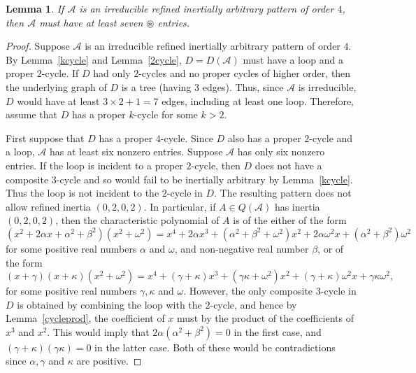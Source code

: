 \documentclass[10pt]{amsart}
\newtheorem{lemma}[proposition]{Lemma}
\begin{document}
\begin{lemma}\label{not6}
If ${\mathcal{A}}$ is an irreducible refined inertially arbitrary 
pattern of order $4$, then ${\mathcal{A}}$ must have at least seven ${\circledast}$ entries.
\end{lemma}

\begin{proof}
Suppose ${\mathcal{A}}$ is an irreducible refined inertially arbitrary pattern of order $4$. 
By Lemma~\ref{kcycle} and Lemma~\ref{2cycle}, $D=D({\mathcal{A}})$ must have a 
loop and a proper $2$-cycle. If $D$ had only $2$-cycles and no
proper cycles of higher order, then the underlying graph of $D$ is a tree (having $3$ edges). Thus, since ${\mathcal{A}}$ is irreducible, 
 $D$ would have at least $3\times 2 +1=7$ edges, including at least one loop. Therefore, assume that $D$ has a proper $k$-cycle for some $k >2$. 

First suppose that $D$ has a proper $4$-cycle. Since $D$ also has a proper $2$-cycle and a loop, 
${\mathcal{A}}$ has at least six nonzero entries. Suppose ${\mathcal{A}}$ has only six nonzero entries. 
If the loop is incident to a proper $2$-cycle, then $D$ does not have a composite $3$-cycle
and so would fail to be inertially arbitrary by Lemma~\ref{kcycle}. Thus the loop is not
incident to the $2$-cycle in $D$. The resulting pattern does not allow refined
inertia $(0,2,0,2)$. In particular, if $A\in Q({\mathcal{A}})$ has inertia $(0,2,0,2)$, then
the characteristic polynomial of $A$ is of the either of the form 
$$(x^2+2\alpha x+\alpha^2+\beta^2)(x^2+\omega^2)
= x^4+2\alpha x^3+(\alpha^2+\beta^2+\omega^2)x^2+2\alpha \omega^2 x+ (\alpha^2+\beta^2)\omega^2$$
for some positive real numbers $\alpha$ and $\omega$, and non-negative real number $\beta$, or of the form
$$(x+\gamma)(x+\kappa)(x^2+\omega^2)=x^4+(\gamma+\kappa)x^3+(\gamma\kappa+\omega^2)x^2+(\gamma+\kappa)\omega^2x
+\gamma\kappa\omega^2,
$$
for some positive real numbers $\gamma, \kappa$ and $\omega$. 
However, the only composite $3$-cycle in $D$ is obtained by combining the loop with
the $2$-cycle, and hence by Lemma~\ref{cycleprod}, the coefficient of $x$ must by
the product of the coefficients of $x^3$ and $x^2$. This would imply that
$2\alpha(\alpha^2+\beta^2)=0$ in the first case, and 
$(\gamma+\kappa)(\gamma\kappa)=0$ in the latter case. Both of these would
be contradictions since $\alpha, \gamma$ and $\kappa$ are positive. 


\end{proof}
\end{document}

